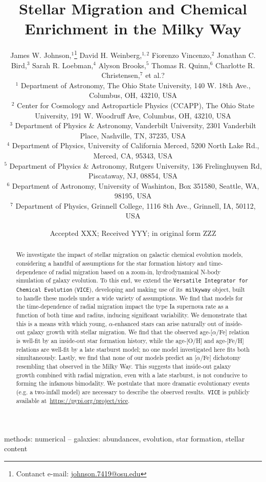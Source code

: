 \documentclass[a4paper, fleqn, usenatbib, useAMS]{mnras}
\title{Stellar Migration and Chemical Enrichment in the Milky Way}
\author[J.W. Johnson et al.]{
	James W. Johnson,$^{1}$\thanks{Contanct e-mail: \href{mailto:
	johnson.7419@osu.edu}{johnson.7419@osu.edu}} 
	David H. Weinberg,$^{1, 2}$ 
	Fiorenzo Vincenzo,$^{2}$ 
	Jonathan C. Bird,$^{3}$ 
	\newauthor 
	Sarah R. Loebman,$^{4}$ 
	Alyson Brooks,$^{5}$ 
	Thomas R. Quinn,$^{6}$ 
	Charlotte R. Christensen,$^{7}$ 
	\newauthor 
	et al.?
	\\
	$^{1}$ Department of Astronomy, The Ohio State University, 
	140 W. 18th Ave., Columbus, OH, 43210, USA 
	\\ 
	$^{2}$ Center for Cosmology and Astroparticle Physics (CCAPP), 
	The Ohio State University, 191 W. Woodruff Ave, Columbus, OH, 43210, USA 
	\\ 
	$^{3}$ Department of Physics \& Astronomy, Vanderbilt University, 
	2301 Vanderbilt Place, Nashville, TN, 37235, USA 
	\\ 
	$^{4}$ Department of Physics, University of California Merced, 
	5200 North Lake Rd., Merced, CA, 95343, USA 
	\\ 
	$^{5}$ Department of Physics \& Astronomy, Rutgers University, 136 
	Frelinghuysen Rd, Piscataway, NJ, 08854, USA 
	\\ 
	$^{6}$ Department of Astronomy, University of Washinton, Box 351580, 
	Seattle, WA, 98195, USA 
	\\ 
	$^{7}$ Department of Physics, Grinnell College, 1116 8th Ave., Grinnell, 
	IA, 50112, USA 
}
\date{Accepted XXX; Received YYY; in original form ZZZ}
\begin{document}
 
\label{firstpage} 
\pagerange{\pageref{firstpage}--\pageref{lastpage}} 
\maketitle 

\begin{abstract} 
We investigate the impact of stellar migration on galactic chemical evolution 
models, considering a handful of assumptions for the star formation history 
and time-dependence of radial migration based on a zoom-in, hydrodynamical 
N-body simulation of galaxy evolution. To this end, we extend the 
\texttt{Versatile Integrator for Chemical Evolution} (\texttt{VICE}), 
developing and making use of its~\texttt{milkyway} object, built to handle 
these models under a wide variety of assumptions. We find that models for the 
time-dependence of radial migration impact the type Ia supernova rate as a 
function of both time and radius, inducing significant variability. We 
demonstrate that this is a means with which young, $\alpha$-enhanced stars can 
arise naturally out of inside-out galaxy growth with stellar migration. We find 
that the observed age-[$\alpha$/Fe] relation is well-fit by an inside-out star 
formation history, while the age-[O/H] and age-[Fe/H] relations are well-fit by 
a late starburst model; no one model investigated here fits both 
simultaneously. Lastly, we find that none of our models predict an 
[$\alpha$/Fe] dichotomy resembling that observed in the Milky Way. This 
suggests that inside-out galaxy growth combined with radial migration, even 
with a late starburst, is not conducive to forming the infamous bimodality. 
We postulate that more dramatic evolutionary events (e.g. a two-infall model) 
are necessary to describe the observed results.~\texttt{VICE} is publicly 
available at~\url{https://pypi.org/project/vice}. 
\end{abstract} 

\begin{keywords} 
methods: numerical -- galaxies: abundances, evolution, star formation, stellar 
content 
\end{keywords}
\end{document}
